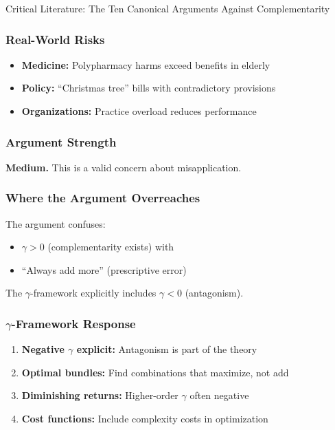 \begin{chapter}{Critical Literature: The Ten Canonical Arguments Against Complementarity}
\subsubsection{Real-World Risks}

\begin{itemize}[noitemsep]
    \item \textbf{Medicine:} Polypharmacy harms exceed benefits in elderly
    \item \textbf{Policy:} ``Christmas tree'' bills with contradictory provisions
    \item \textbf{Organizations:} Practice overload reduces performance
\end{itemize}

\subsubsection{Argument Strength}

\textbf{Medium.} This is a valid concern about misapplication.

\subsubsection{Where the Argument Overreaches}

The argument confuses:
\begin{itemize}[noitemsep]
    \item $\gamma > 0$ (complementarity exists) with
    \item ``Always add more'' (prescriptive error)
\end{itemize}

The $\gamma$-framework explicitly includes $\gamma < 0$ (antagonism).

\subsubsection{$\gamma$-Framework Response}

\begin{enumerate}
    \item \textbf{Negative $\gamma$ explicit:} Antagonism is part of the theory
    \item \textbf{Optimal bundles:} Find combinations that maximize, not add
    \item \textbf{Diminishing returns:} Higher-order $\gamma$ often negative
    \item \textbf{Cost functions:} Include complexity costs in optimization
\end{enumerate}


\end{chapter}
